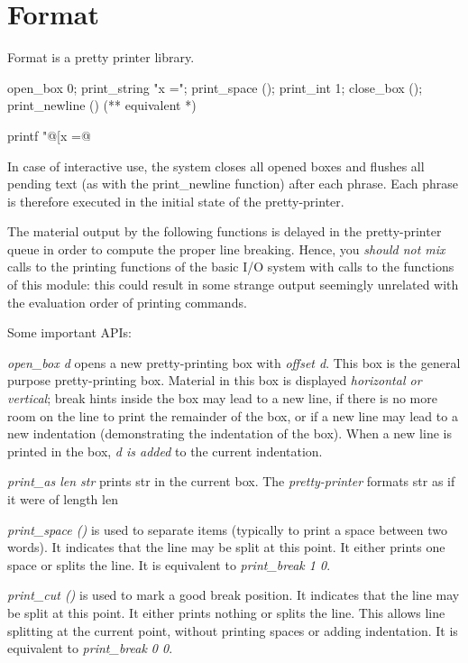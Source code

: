 
\section{Format}

Format is a pretty printer library. 

\begin{ocamlcode}
  open_box 0; print_string "x ="; print_space ();
  print_int 1; close_box (); print_newline ()
  (** equivalent *)

  printf "@[x =@ %
\end{ocamlcode}

In case of interactive use, the system closes all opened boxes and
flushes all pending text (as with the print\_newline function) after
each phrase. Each phrase is therefore executed in the initial state of
the pretty-printer.

The material output by the following functions is delayed in the
pretty-printer queue in order to compute the proper line
breaking. Hence, you \textit{should not mix} calls to the printing
functions of the basic I/O system with calls to the functions of this
module: this could result in some strange output seemingly unrelated
with the evaluation order of printing commands.

Some important APIs:


\textit{open\_box d} opens a new pretty-printing box with
\textit{offset d}. This box is the general purpose pretty-printing
box. Material in this box is displayed \textit{horizontal or
  vertical}; break hints inside the box may lead to a new line, if
there is no more room on the line to print the remainder of the box,
or if a new line may lead to a new indentation (demonstrating the
indentation of the box). When a new line is printed in the box,
\textit{d is added} to the current indentation.

\textit{print\_as len str} prints str in the current box. The
\textit{pretty-printer} formats str as if it were of length len

\textit{print\_space ()} is used to separate items (typically to print
a space between two words). It indicates that the line may be split at
this point. It either prints one space or splits the line. It is
equivalent to \textit{print\_break 1 0}.

\textit{print\_cut () }is used to mark a good break position. It
indicates that the line may be split at this point. It either prints
nothing or splits the line. This allows line splitting at the current
point, without printing spaces or adding indentation. It is equivalent
to \textit{print\_break 0 0}.

